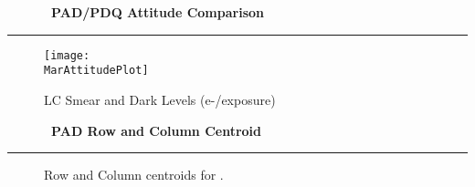 \cleardoublepage
\begin{figure*}[h!]
  \centering
  \hfill
  {\Huge {\bf \quarter\ PAD/PDQ Attitude Comparison}}
  \hfill
\end{figure*}
\hrule
\begin{figure*}[h!]
  \centering
  \texttt{[image: \\MarAttitudePlot]}
  \caption{LC Smear and Dark Levels (e-/exposure)}
\end{figure*}

\cleardoublepage
\begin{figure*}[h!]
  \centering
  \hfill
  {\Huge {\bf \quarter\ PAD Row and Column Centroid}}
  \hfill
\end{figure*}
\hrule
\begin{figure*}[h!]
  \centering
  \caption{Row and Column centroids for \quarter.}
\end{figure*}

